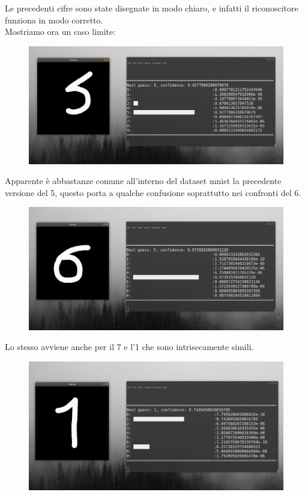 \documentclass[12pt]{article}
\begin{document}
Le precedenti cifre sono state disegnate in modo chiaro, e infatti
il riconoscitore funziona in modo corretto.\\

Mostriamo ora un caso limite:

\begin{figure}[H]{}
    \centering
    \includegraphics[scale=1]{../images/5meh.png}
    \label{fig:cc}
\end{figure}

Apparente è abbastanze comune all'interno del dataset mnist
la precedente versione del 5, questo porta a qualche confusione
soprattutto nei confronti del 6.

\begin{figure}[H]{}
    \centering
    \includegraphics[scale=1]{../images/6no.png}
    \label{fig:cc}
\end{figure}

Lo stesso avviene anche per il 7 e l'1 che sono intrisecamente simili.

\begin{figure}[H]{}
    \centering
    \includegraphics[scale=1]{../images/1meh.png}
    \label{fig:cc}
\end{figure}
\end{document}
